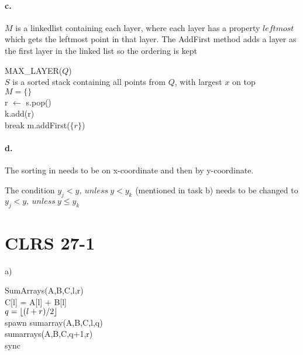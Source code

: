\paragraph{c.}
$M$ is a linkedlist containing each layer, where each layer has a property $leftmost$ which gets the leftmost point in that layer.
The AddFirst method adds a layer as the first layer in the linked list so the ordering is kept


\begin{algorithm}[H]
MAX\_LAYER($Q$) \\
$S$ is a sorted stack containing all points from $Q$, with largest $x$ on top \\
$M = \{ \}$ \\
{
	r $\leftarrow$ s.pop() \\
	{
		{
			k.add(r) \\
			break
		}
	}
	m.addFirst($\{r\}$)
}
\end{algorithm}

\paragraph{d.}

The sorting in needs to be on x-coordinate and then by y-coordinate.

The condition $ y_j < y, \ unless \ y < y_k $ (mentioned in task b) needs to be changed to $ y_j < y, \ unless \ y \leq y_k $

\section*{CLRS 27-1}

a)

\begin{algorithm}[H]
SumArrays(A,B,C,l,r)\\
{C[l] = A[l] + B[l]\\}
{$ q = \lfloor(l+r)/2\rfloor $\\
spawn sumarray(A,B,C,l,q)\\
sumarrays(A,B,C,q+1,r)\\
sync}
\end{algorithm}



